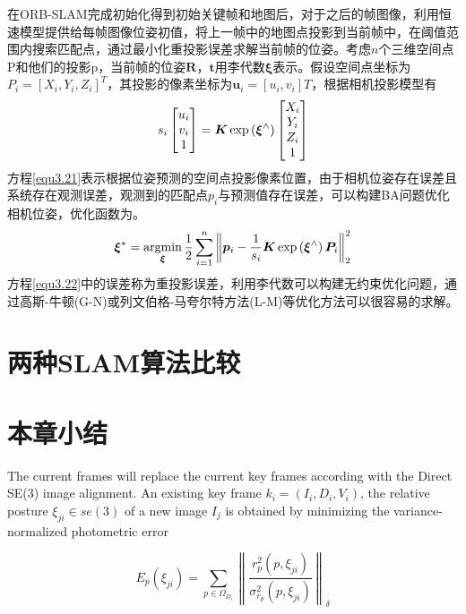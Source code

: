在ORB-SLAM完成初始化得到初始关键帧和地图后，对于之后的帧图像，利用恒速模型提供给每帧图像位姿初值，将上一帧中的地图点投影到当前帧中，在阈值范围内搜索匹配点，通过最小化重投影误差求解当前帧的位姿。考虑$n$个三维空间点P和他们的投影p，当前帧的位姿$\boldsymbol{R}$，$\boldsymbol{t}$用李代数$\boldsymbol{\xi}$表示。假设空间点坐标为$P_i=[X_i,Y_i,Z_i]^T$，其投影的像素坐标为$\boldsymbol{u}_i = [u_i,v_i]T$，根据相机投影模型有
\begin{equation}
\label{equ3.21}
s_i
\begin{bmatrix}
u_i \cr v_i \cr 1\cr 
\end{bmatrix}
=
\boldsymbol{K} \exp\left( \boldsymbol{\xi}^{\wedge} \right)
\begin{bmatrix}
X_i \cr Y_i \cr Z_i \cr 1 \cr
\end{bmatrix}
\end{equation}
方程\eqref{equ3.21}表示根据位姿预测的空间点投影像素位置，由于相机位姿存在误差且系统存在观测误差，观测到的匹配点$p_i$与预测值存在误差，可以构建BA问题优化相机位姿，优化函数为。
\begin{equation}
\label{equ3.22}
\boldsymbol{\xi}^* = \operatorname*{argmin}\limits_{\boldsymbol{\xi}} {1 \over 2} \sum\limits_{i=1}^n  \left \Vert \boldsymbol{p}_i - {1 \over s_i} \boldsymbol{K} \exp\left( \boldsymbol{\xi}^{\wedge} \right) \boldsymbol{P}_i  \right \Vert_2^2
\end{equation}
方程\eqref{equ3.22}中的误差称为重投影误差，利用李代数可以构建无约束优化问题，通过高斯-牛顿(G-N)或列文伯格-马夸尔特方法(L-M)等优化方法可以很容易的求解。

\section{两种SLAM算法比较}





\section{本章小结}






\iffalse
The current frames will replace the current key frames according with the Direct SE(3) image alignment. An existing key frame ${k_i} = ({I_i},{D_i},{V_i})$, the relative posture ${\xi _{ji}} \in se(3)$ of a new image ${I_j}$ is obtained by minimizing the variance-normalized photometric error

\begin{equation}
E_{p}(\xi _{ji}) = \sum\limits_{p \in \Omega _{D_{i}}} \left\|  \frac{r_{p}^{2} (p,\xi_{ji})}{\sigma_{r_{p}}^{2} (p,\xi_{ji})}  \right\|_{\delta}
\end{equation}


